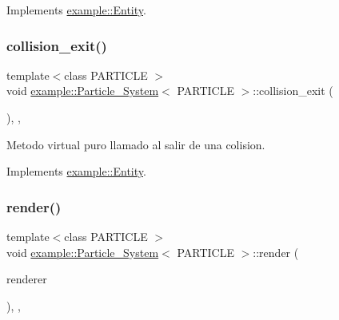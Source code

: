 Implements \mbox{\hyperlink{classexample_1_1_entity_a09f6836192c2f8bce91a7b4f6934b94e}{example\+::\+Entity}}.

\mbox{\label{classexample_1_1_particle___system_a82dfe08a8910532c5cd6a0a50fb79f23}} 
\subsubsection{\texorpdfstring{collision\_exit()}{collision\_exit()}}
{\footnotesize\ttfamily template$<$class P\+A\+R\+T\+I\+C\+LE $>$ \\
void \mbox{\hyperlink{classexample_1_1_particle___system}{example\+::\+Particle\+\_\+\+System}}$<$ P\+A\+R\+T\+I\+C\+LE $>$\+::collision\+\_\+exit (\begin{DoxyParamCaption}\item[{\mbox{\hyperlink{classexample_1_1_entity}{Entity}} $\ast$}]{ }\end{DoxyParamCaption})\hspace{0.3cm}{\ttfamily [inline]}, {\ttfamily [override]}, {\ttfamily [virtual]}}



Metodo virtual puro llamado al salir de una colision. 



Implements \mbox{\hyperlink{classexample_1_1_entity_ae5d520b5f0dda6bb56a6c74eaf1c850c}{example\+::\+Entity}}.

\mbox{\label{classexample_1_1_particle___system_aed070ca0042af0428dd942fe4f1e0241}} 
\subsubsection{\texorpdfstring{render()}{render()}}
{\footnotesize\ttfamily template$<$class P\+A\+R\+T\+I\+C\+LE $>$ \\
void \mbox{\hyperlink{classexample_1_1_particle___system}{example\+::\+Particle\+\_\+\+System}}$<$ P\+A\+R\+T\+I\+C\+LE $>$\+::render (\begin{DoxyParamCaption}\item[{sf\+::\+Render\+Window \&}]{renderer }\end{DoxyParamCaption})\hspace{0.3cm}{\ttfamily [inline]}, {\ttfamily [override]}, {\ttfamily [virtual]}}



